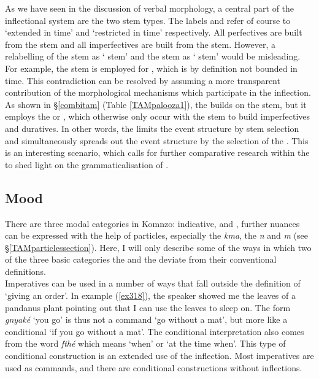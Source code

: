 As we have seen in the discussion of verbal morphology, a central part of the inflectional system are the two stem types. The labels \Ext{} and \Rs{} refer of course to `extended in time' and `restricted in time' respectively. All perfectives are built from the \Rs{} stem and all imperfectives are built from the \Ext{} stem. However, a relabelling of the \Rs{} stem as ` stem' and the \Ext{} stem as ` stem' would be misleading. For example, the \Rs{} stem is employed for  , which is by definition not bounded in time. This contradiction can be resolved by assuming a more transparent contribution of the morphological mechanisms which participate in the  inflection. As shown in \S{}\ref{combitam} (Table \ref{TAMpalooza1}), the  builds on the \Rs{} stem, but it employs the \Betaone{} or \Betatwo{} , which otherwise only occur with the \Ext{} stem to build imperfectives and duratives. In other words, the   limits the event structure by stem selection and simultaneously spreads out the event structure by the selection of the . This is an interesting scenario, which calls for further comparative research within the  to shed light on the grammaticalisation of  .

\subsection{Mood}\label{TAMsemmood}

There are three modal categories in Komnzo: indicative,  and , further nuances can be expressed with the help of particles, especially the  \emph{kma}, the  \emph{n} and  \emph{m} (see \S{}\ref{TAMparticlessection}). Here, I will only describe some of the ways in which two of the three basic categories \textendash{} the  and the  \textendash{} deviate from their conventional definitions.\\

Imperatives can be used in a number of ways that fall outside the definition of `giving an order'. In example (\ref{ex318}), the speaker showed me the leaves of a pandanus plant pointing out that I can use the leaves to sleep on. The  form \emph{gnyaké} `you go' is thus not a command `go without a mat', but more like a conditional `if you go without a mat'. The conditional interpretation also comes from the word \emph{fthé} which means `when' or `at the time when'. This type of conditional construction is an extended use of the  inflection. Most imperatives are used as commands, and there are conditional constructions without  inflections.

